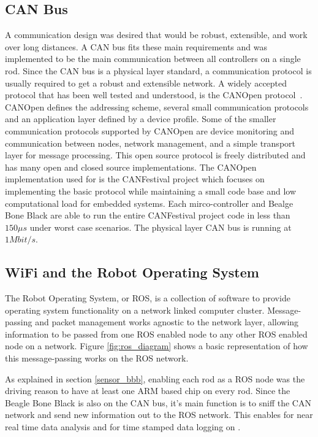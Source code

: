 \subsection{CAN Bus}
A communication design was desired that would be robust, extensible, and work over long distances.
A CAN bus fits these main requirements and was implemented to be the main communication between all controllers on a single rod.
Since the CAN bus is a physical layer standard, a communication protocol is usually required to get a robust and extensible network.
A widely accepted protocol that has been well tested and understood, is the CANOpen protocol~\cite{boterenbrood2000canopen}.
CANOpen defines the addressing scheme, several small communication protocols and an application layer defined by a device profile.
Some of the smaller communication protocols supported by CANOpen are device monitoring and communication between nodes, network management, and a simple transport layer for message processing.
This open source protocol is freely distributed and has many open and closed source implementations.
The CANOpen implementation used for \SB{} is the CANFestival project which focuses on implementing the basic protocol while maintaining a small code base and low computational load for embedded systems.
Each mirco-controller and Bealge Bone Black are able to run the entire CANFestival project code in less than \(150 \mu s\) under worst case scenarios.
The physical layer CAN bus is running at \(1 Mbit/s\).

\subsection{WiFi and the Robot Operating System}
The Robot Operating System, or ROS, is a collection of software to provide operating system functionality on a network linked computer cluster. 
Message-passing and packet management works agnostic to the network layer, allowing information to be passed from one ROS enabled node to any other ROS enabled node on a network.
Figure \ref{fig:ros_diagram} shows a basic representation of how this message-passing works on the \SB{} ROS network.

As explained in section \ref{sensor_bbb}, enabling each rod as a ROS node was the driving reason to have at least one ARM based chip on every rod.
Since the Beagle Bone Black is also on the CAN bus, it's main function is to sniff the CAN network and send new information out to the ROS network.
This enables for near real time data analysis and for time stamped data logging on \SB{}.

